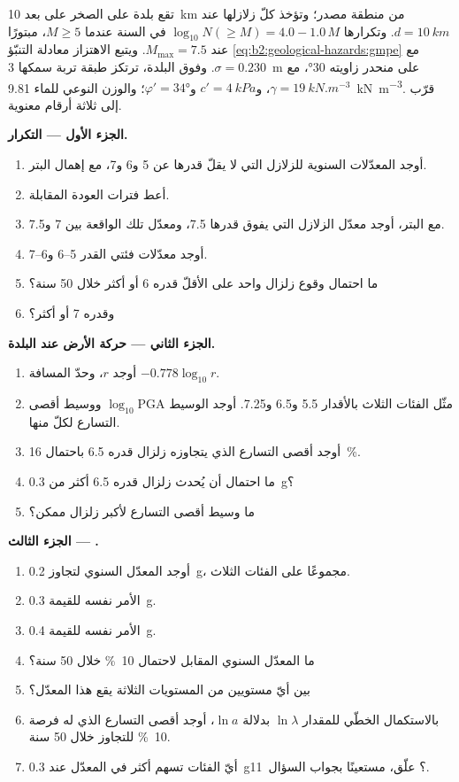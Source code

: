\begin{problem}\label{pb:b2:geological-hazards:1}
تقع بلدة على الصخر على بعد \qty{10}{km} من منطقة مصدر؛ وتؤخذ كلّ زلازلها عند
$d = \qty{10}{km}$. وتكرارها $\log_{10} N(\geq M) = 4.0 - 1.0\,M$ في السنة عندما $M \geq 5$،
مبتورًا عند $M_{\max} = 7.5$. ويتبع الاهتزاز معادلة التنبّؤ \eqref{eq:b2:geological-hazards:gmpe}
مع $\sigma = 0.230$. وفوق البلدة، ترتكز طبقة تربة سمكها \qty{3}{m} على منحدر زاويته \ang{30}،
مع $\gamma = \qty{19}{kN.m^{-3}}$، و$c' = \qty{4}{kPa}$ و$\varphi' = \ang{34}$؛ والوزن النوعي
للماء \qty{9.81}{kN.m^{-3}}. قرّب إلى ثلاثة أرقام معنوية.

\noindent\textbf{الجزء الأول --- التكرار.}
\begin{enumerate}
  \item أوجد المعدّلات السنوية للزلازل التي لا يقلّ قدرها عن 5 و6 و7، مع إهمال
        البتر.
  \item أعط فترات العودة المقابلة.
  \item مع البتر، أوجد معدّل الزلازل التي يفوق قدرها 7.5، ومعدّل تلك الواقعة بين 7
        و7.5.
  \item أوجد معدّلات فئتي القدر 5--6 و6--7.
  \item ما احتمال وقوع زلزال واحد على الأقلّ قدره 6 أو أكثر خلال 50 سنة؟
  \item وقدره 7 أو أكثر؟
\end{enumerate}

\noindent\textbf{الجزء الثاني --- حركة الأرض عند البلدة.}
\begin{enumerate}[resume]
  \item أوجد $r$، وحدّ المسافة $-0.778\log_{10} r$.
  \item مثّل الفئات الثلاث بالأقدار 5.5 و6.5 و7.25. أوجد الوسيط
        $\log_{10}\mathrm{PGA}$ ووسيط أقصى التسارع لكلّ منها.
  \item أوجد أقصى التسارع الذي يتجاوزه زلزال قدره 6.5 باحتمال \qty{16}{\percent}.
  \item ما احتمال أن يُحدث زلزال قدره 6.5 أكثر من \qty{0.3}{g}؟
  \item ما وسيط أقصى التسارع لأكبر زلزال ممكن؟
\end{enumerate}

\noindent\textbf{الجزء الثالث --- .}
\begin{enumerate}[resume]
  \item أوجد المعدّل السنوي لتجاوز \qty{0.2}{g}، مجموعًا على الفئات الثلاث.
  \item الأمر نفسه للقيمة \qty{0.3}{g}.
  \item الأمر نفسه للقيمة \qty{0.4}{g}.
  \item ما المعدّل السنوي المقابل لاحتمال \qty{10}{\percent} خلال 50 سنة؟
  \item بين أيّ مستويين من المستويات الثلاثة يقع هذا المعدّل؟
  \item بالاستكمال الخطّي للمقدار $\ln\lambda$ بدلالة $\ln a$، أوجد أقصى التسارع الذي
        له فرصة \qty{10}{\percent} للتجاوز خلال 50 سنة.
  \item أيّ الفئات تسهم أكثر في المعدّل عند \qty{0.3}{g}؟ علّق، مستعينًا بجواب
        السؤال~11.
\end{enumerate}


\end{problem}
